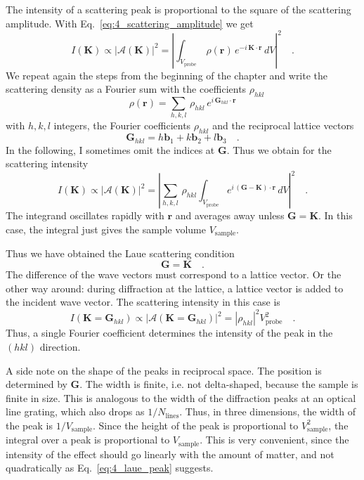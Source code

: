 The intensity of a scattering peak is proportional to the square of the scattering amplitude. With Eq.~\ref{eq:4_scattering_amplitude} we get
\begin{equation}
I(\mathbf{K}) \propto \left| \mathcal{A}(\mathbf{K}) \right|^2 
= \left| \int_{V_\text{probe}} \, \rho( \mathbf{r}) \, e^{- i \, \mathbf{K} \cdot \mathbf{r}} \, dV \right|^2 \quad .
\end{equation}
We repeat again the steps from the beginning of the chapter and write the scattering density as a Fourier sum with the coefficients $\rho_{hkl}$
\begin{equation}
  \rho(\mathbf{r}) = \sum_{h,k,l} \, \rho_{hkl} \, e^{i \, \mathbf{G}_{hkl} \cdot \mathbf{r}}
\end{equation}
with $h,k,l$ integers, the Fourier coefficients $\rho_{hkl}$ and the reciprocal lattice vectors
\begin{equation}
\mathbf{G}_{hkl} = h \mathbf{b}_1 + k \mathbf{b}_2 + l \mathbf{b}_3 \quad .
\end{equation}
In the following, I sometimes omit the indices at $\mathbf{G}$. Thus we obtain for the scattering intensity 
\begin{equation}
I(\mathbf{K}) \propto \left| \mathcal{A}(\mathbf{K}) \right|^2 
= \left| 
 \sum_{h,k,l} \, \rho_{hkl}
  \int_{V_\text{probe}} e^{ i \, (\mathbf{G}- \mathbf{K} )\cdot \mathbf{r}} \, dV \right|^2 \quad .
\end{equation}
The integrand oscillates rapidly with $\mathbf{r}$ and averages away unless $\mathbf{G} = \mathbf{K}$. In this case, the integral just gives the sample volume $V_\text{sample}$.

Thus we have obtained the Laue scattering condition
\begin{equation}
\mathbf{G} = \mathbf{K} \quad .
\end{equation}
The difference of the wave vectors must correspond to a lattice vector. Or the other way around: during diffraction at the lattice, a lattice vector is added to the incident wave vector.  The scattering intensity in this case is
\begin{equation}
I(\mathbf{K} = \mathbf{G}_{hkl} ) \propto \left| \mathcal{A}(\mathbf{K} = \mathbf{G}_{hkl} ) \right|^2 
= \left| \rho_{hkl} \right|^2 V_\text{probe}^2 \quad . \label{eq:4_laue_peak}
\end{equation}
Thus, a single Fourier coefficient determines the intensity of the peak in the $(hkl)$ direction.


A side note on the shape of the peaks in reciprocal space. The position is determined by $\mathbf{G}$. The width is finite, i.e. not delta-shaped, because the sample is finite in size. This is analogous to the width of the diffraction peaks at an optical line grating, which also drops as $1/N_\text{lines}$. Thus, in three dimensions, the width of the peak is $1/V_\text{sample}$. Since the height of the peak is proportional to $ V_\text{sample}^2$, the integral over a peak is proportional to $V_\text{sample}$. This is very convenient, since the intensity of the effect should go linearly with the  amount of matter, and not quadratically as Eq.~\ref{eq:4_laue_peak} suggests.


